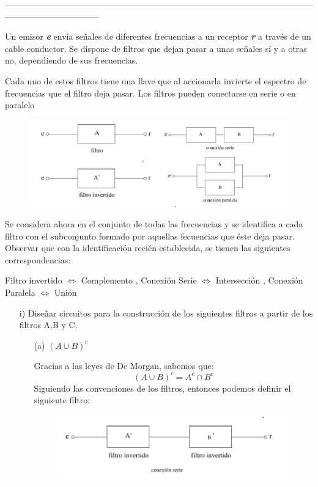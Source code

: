 \documentclass[10pt]{article}
\begin{document}
---------------------------------------------------------------------------------------------------------------------------------------------
\begin{ej}
Un emisor \textbf{\textit{e}} envía señales de diferentes frecuencias a un receptor \textbf{\textit{r}} a través de un cable conductor.
Se dispone de filtros que dejan pasar a unas señales sí y a otras no, dependiendo de sus frecuencias.

Cada uno de estos filtros tiene una llave que al accionarla invierte el espectro de frecuencias que el filtro deja pasar. Los filtros pueden conectarse en serie o en paralelo
\begin{figure}[H]
		\centering
		 \includegraphics[scale=0.7]{figuras/conjuntos/ejercicio15/img1.png}
\end{figure}
Se considera ahora en el conjunto de todas las frecuencias y se identifica a cada filtro con el subconjunto
formado por aquellas fecuencias que éste deja pasar. Observar que con la identificación
recién establecida, se tienen las siguientes correspondencias:

 Filtro invertido $\Leftrightarrow$ Complemento , Conexión Serie $\Leftrightarrow$ Intersección , Conexión Paralela $\Leftrightarrow$ Unión
\begin{itemize}
	\item[i)] Diseñar circuitos para la construcción de los siguientes filtros  a partir de los filtros A,B y C.
	\begin{itemize}
		\item[(a)] $(A \cup B)^c$
				
				Gracias a las leyes de De Morgan, sabemos que:
				$$(A \cup B)^c = A^c \cap B^c$$ 
				Siguiendo las convenciones de los filtros, entonces podemos definir el siguiente filtro:
				\begin{figure}[H]
					\centering
		 			\includegraphics[scale=0.7]{figuras/conjuntos/ejercicio15/img2.png}
				\end{figure}
		

\end{itemize}
\end{itemize}
\end{ej}
\end{document}
